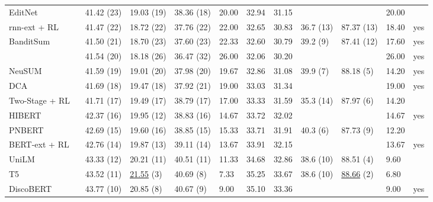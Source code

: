 \documentclass[11pt]{article}
\theoremstyle{remark}
\begin{document}
\begin{landscape}
\begin{table}[t]
\begin{tabularx}{\linewidth}{Xllllllllll}
EditNet                        ~\citealp{moroshko-etal-2019-editorial} & 41.42 (23) & 19.03 (19) & 38.36 (18) & 20.00 & 32.94 & 31.15 &          &           & 20.00 &     \\
rnn-ext + RL                   ~\citealp{chen-bansal-2018-fast} & 41.47 (22) & 18.72 (22) & 37.76 (22) & 22.00 & 32.65 & 30.83 & 36.7 (13) & 87.37 (13) & 18.40 & yes \\
BanditSum                      ~\citealp{dong-etal-2018-banditsum} & 41.50 (21) & 18.70 (23) & 37.60 (23) & 22.33 & 32.60 & 30.79 & 39.2 (9) & 87.41 (12) & 17.60 & yes \\
                               ~\citealp{li-etal-2018-improving} & 41.54 (20) & 18.18 (26) & 36.47 (32) & 26.00 & 32.06 & 30.20 &          &           & 26.00 & yes \\
NeuSUM                         ~\citealp{zhou-etal-2018-neural-document} & 41.59 (19) & 19.01 (20) & 37.98 (20) & 19.67 & 32.86 & 31.08 & 39.9 (7) & 88.18 (5) & 14.20 & yes \\
DCA                            ~\citealp{celikyilmaz-etal-2018-deep} & 41.69 (18) & 19.47 (18) & 37.92 (21) & 19.00 & 33.03 & 31.34 &          &           & 19.00 & yes \\
Two-Stage + RL                 ~\citealp{zhang-etal-2019-pretraining} & 41.71 (17) & 19.49 (17) & 38.79 (17) & 17.00 & 33.33 & 31.59 & 35.3 (14) & 87.97 (6) & 14.20 &     \\
HIBERT                         ~\citealp{zhang-etal-2019-hibert} & 42.37 (16) & 19.95 (12) & 38.83 (16) & 14.67 & 33.72 & 32.02 &          &           & 14.67 & yes \\
PNBERT                         ~\citealp{zhong-etal-2019-searching} & 42.69 (15) & 19.60 (16) & 38.85 (15) & 15.33 & 33.71 & 31.91 & 40.3 (6) & 87.73 (9) & 12.20 &     \\
BERT-ext + RL                  ~\citealp{bae-etal-2019-summary} & 42.76 (14) & 19.87 (13) & 39.11 (14) & 13.67 & 33.91 & 32.15 &          &           & 13.67 & yes \\
UniLM                          ~\citealp{dong2019unified} & 43.33 (12) & 20.21 (11) & 40.51 (11) & 11.33 & 34.68 & 32.86 & 38.6 (10) & 88.51 (4) & 9.60  &     \\
T5                             ~\citealp{raffel2019exploring} & 43.52 (11) & \underline{\underline{21.55}} (3) & 40.69 (8) & 7.33  & 35.25 & 33.67 & 38.6 (10) & \underline{88.66} (2) & 6.80  &     \\
DiscoBERT                      ~\citealp{xu-etal-2020-discourse} & 43.77 (10) & 20.85 (8) & 40.67 (9) & 9.00  & 35.10 & 33.36 &          &           & 9.00  & yes \\

\end{tabularx}
\end{table}
\end{landscape}
\end{document}
